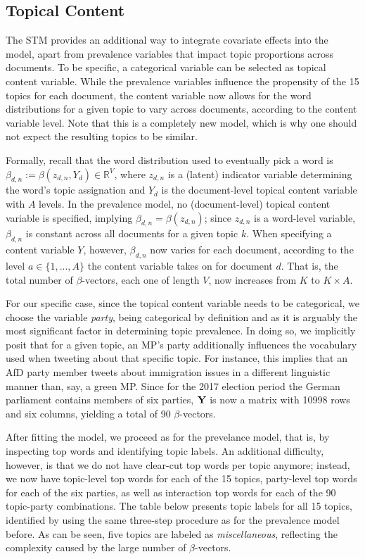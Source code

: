 \subsection{Topical Content}

The STM provides an additional way to integrate covariate effects into the model, apart from prevalence variables that impact topic proportions across documents. To be specific, a categorical variable can be selected as topical content variable. While the prevalence variables influence the propensity of the 15 topics for each document, the content variable now allows for the word distributions for a given topic to vary across documents, according to the content variable level. Note that this is a completely new model, which is why one should not expect the resulting topics to be similar. 

Formally, recall that the word distribution used to eventually pick a word is $\beta_{d,n} := \beta(z_{d,n}, Y_d) \in \mathbb{R}^V$, where $z_{d,n}$ is a (latent) indicator variable determining the word's topic assignation and $Y_{d}$ is the document-level topical content variable with $A$ levels. In the prevalence model, no (document-level) topical content variable is specified, implying $\beta_{d,n} = \beta(z_{d,n})$; since $z_{d,n}$ is a word-level variable, $\beta_{d,n}$ is constant across all documents for a given topic $k$. When specifying a content variable $Y$, however, $\beta_{d,n}$ now varies for each document, according to the level $a \in \{1, ..., A\}$ the content variable takes on for document $d$. That is, the total number of $\beta$-vectors, each one of length $V$, now increases from $K$ to $K \times A$.

For our specific case, since the topical content variable needs to be categorical, we choose the variable \textit{party}, being categorical by definition and as it  is arguably the most significant factor in determining topic prevalence. In doing so, we implicitly posit that for a given topic, an MP's party additionally influences the vocabulary used when tweeting about that specific topic. For instance, this implies that an AfD party member tweets about immigration issues in a different linguistic manner than, say, a green MP. Since for the 2017 election period the German parliament contains members of six parties, $\bf{Y}$ is now a matrix with 10998 rows and six columns, yielding a total of 90 $\beta$-vectors.

After fitting the model, we proceed as for the prevelance model, that is, by inspecting top words and identifying topic labels. An additional difficulty, however, is that we do not have clear-cut top words per topic anymore; instead, we now have topic-level top words for each of the 15 topics, party-level top words for each of the six parties, as well as interaction top words for each of the 90 topic-party combinations. The table below presents topic labels for all 15 topics, identified by using the same three-step procedure as for the prevalence model before. As can be seen, five topics are labeled as \textit{miscellaneous}, reflecting the complexity caused by the large number of $\beta$-vectors.

